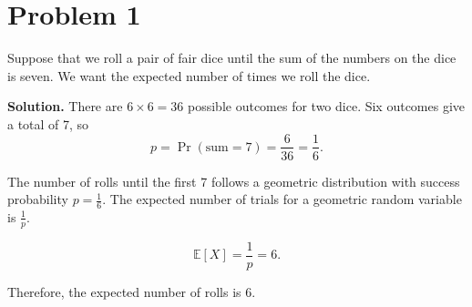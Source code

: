 \section*{Problem 1}

Suppose that we roll a pair of fair dice until the sum of the numbers on the dice is seven. 
We want the expected number of times we roll the dice.

\textbf{Solution.}  
There are $6 \times 6 = 36$ possible outcomes for two dice.  
Six outcomes give a total of 7, so 
\[
p = \Pr(\text{sum} = 7) = \frac{6}{36} = \frac{1}{6}.
\]

The number of rolls until the first 7 follows a geometric distribution with success probability $p = \tfrac{1}{6}$.  
The expected number of trials for a geometric random variable is $\frac{1}{p}$.

\[
\mathbb{E}[X] = \frac{1}{p} = 6.
\]

Therefore, the expected number of rolls is $\boxed{6}$.
